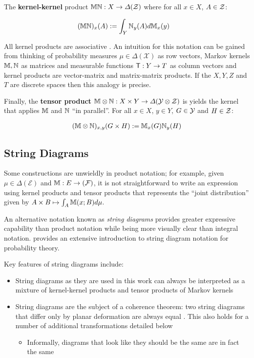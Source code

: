 The \textbf{kernel-kernel} product $\mathbb{M}\mathbb{N}:X\to \Delta(\mathcal{Z})$ where for all $x\in X$, $A\in \mathcal{Z}$:

\begin{align}
(\mathbb{M}\mathbb{N})_x(A) &:= \int_Y \mathbb{N}_y(A) d\mathbb{M}_x(y)
 \end{align} 

All kernel products are associative \citep{cinlar_probability_2011}. An intuition for this notation can be gained from thinking of probability measures $\mu\in \Delta(\mathcal{X})$ as row vectors, Markov kernels $\mathbb{M},\mathbb{N}$ as matrices and measurable functions $\mathsf{T}:Y\to T$ as column vectors and kernel products are vector-matrix and matrix-matrix products. If the $X,Y,Z$ and $T$ are discrete spaces then this analogy is precise.

Finally, the \textbf{tensor product} $\mathbb{M}\otimes \mathbb{N}:X\times Y\to \Delta(\mathcal{Y}\otimes\mathcal{Z})$ is yields the kernel that applies $\mathbb{M}$ and $\mathbb{N}$ ``in parallel''. For all $x\in X$, $y\in Y$, $G\in \mathcal{Y}$ and $H\in \mathcal{Z}$:

\begin{align}
(\mathbb{M}\otimes \mathbb{N})_{x,y}(G\times H) := \mathbb{M}_x(G)\mathbb{N}_y(H)
\end{align}

\subsection{String Diagrams}\label{ssec:mken_diagrams}

Some constructions are unwieldly in product notation; for example, given $\mu\in \Delta(\mathcal{E})$ and $\mathbb{M}:E\to (\mathcal{F})$, it is not straightforward to write an expression using kernel products and tensor products that represents the ``joint distribution'' given by $A\times B\mapsto \int_A \mathbb{M}(x;B)d\mu$.

An alternative notation known as \emph{string diagrams} provides greater expressive capability than product notation while being more visually clear than integral notation. \citet{cho_disintegration_2019} provides an extensive introduction to string diagram notation for probability theory.

Key features of string diagrams include:
\begin{itemize}
	\item String diagrams as they are used in this work can always be interpreted as a mixture of kernel-kernel products and tensor products of Markov kernels
	\item String diagrams are the subject of a coherence theorem: two string diagrams that differ only by planar deformation are always equal \citep{selinger_survey_2010}. This also holds for a number of additional transformations detailed below
	\begin{itemize}
		\item Informally, diagrams that look like they should be the same are in fact the same
	\end{itemize}
\end{itemize}


